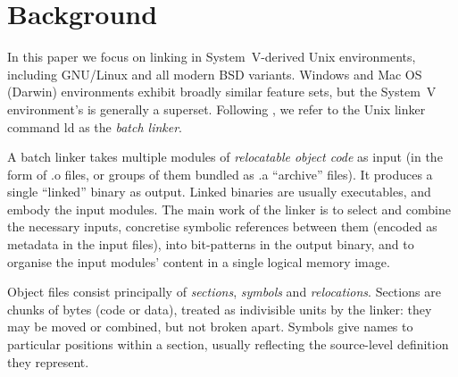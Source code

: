 \section{Background}

% 
% 
% 

In this paper we focus on linking in System~V-derived Unix environments,
including GNU/Linux and all modern BSD variants.
Windows and Mac OS (Darwin) environments exhibit broadly similar feature sets,
but the System~V environment's is generally a superset.
Following \citet{gingell_shared_1987}, we refer to the Unix linker command \textsf{ld}
as the \emph{batch linker}.



A batch linker takes multiple modules of \emph{relocatable object code} 
as input (in the form of \textsf{.o} files, or groups of them bundled as \textsf{.a} ``archive'' files).
It produces a single ``linked'' binary as output.
Linked binaries are usually executables, and embody the input modules.
The main work of the linker is to select and combine the necessary inputs, 
concretise symbolic references between them (encoded as metadata in the input files), 
into bit-patterns in the output binary,
and to organise the input modules' content
in a single logical memory image.

Object files consist principally of \emph{sections}, \emph{symbols} and \emph{relocations}.
Sections are chunks of bytes (code or data), treated as indivisible units
by the linker: they may be moved or combined, but not broken apart. 
Symbols give names to particular positions within a section, 
usually reflecting the source-level definition they represent.

